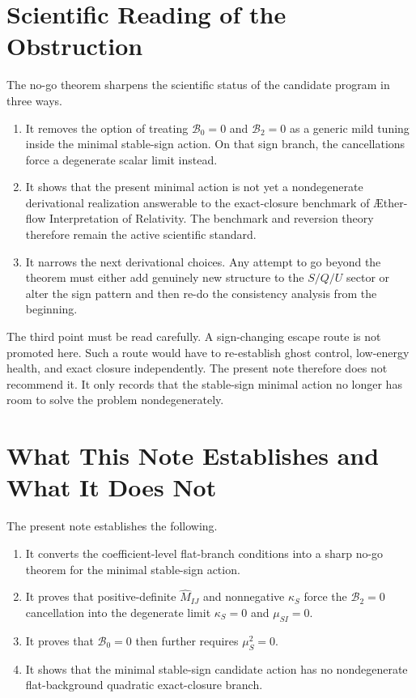 \documentclass[11pt]{article}
\newcommand{\Aflow}{\AE{}ther-flow}
\newcommand{\TheoryName}{\Aflow{} Interpretation of Relativity}
\begin{document}
\section{Scientific Reading of the Obstruction}

The no-go theorem sharpens the scientific status of the candidate program in three ways.
\begin{enumerate}
    \item It removes the option of treating \(\mathcal B_0=0\) and \(\mathcal B_2=0\) as a generic mild tuning inside the minimal stable-sign action. On that sign branch, the cancellations force a degenerate scalar limit instead.
    \item It shows that the present minimal action is not yet a nondegenerate derivational realization answerable to the exact-closure benchmark of \TheoryName{}. The benchmark and reversion theory therefore remain the active scientific standard.
    \item It narrows the next derivational choices. Any attempt to go beyond the theorem must either add genuinely new structure to the \(S/Q/U\) sector or alter the sign pattern and then re-do the consistency analysis from the beginning.
\end{enumerate}

The third point must be read carefully. A sign-changing escape route is not promoted here. Such a route would have to re-establish ghost control, low-energy health, and exact closure independently. The present note therefore does not recommend it. It only records that the stable-sign minimal action no longer has room to solve the problem nondegenerately.

\section{What This Note Establishes and What It Does Not}

The present note establishes the following.
\begin{enumerate}
    \item It converts the coefficient-level flat-branch conditions into a sharp no-go theorem for the minimal stable-sign action.
    \item It proves that positive-definite \(\widehat M_{IJ}\) and nonnegative \(\kappa_S\) force the \(\mathcal B_2=0\) cancellation into the degenerate limit \(\kappa_S=0\) and \(\mu_{SI}=0\).
    \item It proves that \(\mathcal B_0=0\) then further requires \(\mu_S^2=0\).
    \item It shows that the minimal stable-sign candidate action has no nondegenerate flat-background quadratic exact-closure branch.
\end{enumerate}
\end{document}
